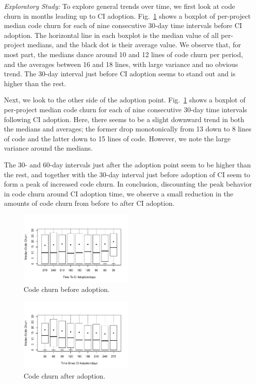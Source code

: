\smallskip\noindent \emph{Exploratory Study:} To explore general trends over 
time, we first look at code churn in months leading up to CI adoption.
Fig.~\ref{Fig:CodeChurnBefore} shows a boxplot of per-project median code 
churn for each of nine consecutive 30-day time intervals before CI adoption.
The horizontal line in each boxplot is the median value of all per-project medians, 
and the black dot is their average value.
We observe that, for most part, the medians dance around 10 and 12 lines of 
code churn per period, and the averages between 16 and 18 lines, with large 
variance and no obvious trend. 
The 30-day interval just before CI adoption seems to stand out and is higher 
than the rest.

Next, we look to the other side of the adoption point. 
Fig.~\ref{Fig:CodeChurnBefore} shows a boxplot of per-project median code 
churn for each of nine consecutive 30-day time intervals following CI adoption.
Here, there seems to be a slight downward trend in both the medians and 
averages; the former drop monotonically from 13 down to 8 lines of code and 
the latter down to 15 lines of code.
However, we note the large variance around the medians.

The 30- and 60-day intervals just after the adoption point seem to be higher 
than the rest, and together with the 30-day interval just before adoption of CI 
seem to form a peak of increased code churn.
In conclusion, discounting the peak behavior in code churn around CI adoption 
time, we observe a small reduction in the amounts of code churn from before 
to after CI adoption.


\begin{figure}[!t]
\centering
\includegraphics[width=0.5\textwidth]{churn_before.pdf}
\caption{Code churn before \Tvis adoption.}
\label{Fig:CodeChurnBefore}
\end{figure}


\begin{figure}[!t]
\centering
\includegraphics[width=0.5\textwidth]{churn_after.pdf}
\caption{Code churn after \Tvis adoption.}
\label{Fig:CodeChurnAfter}
\end{figure}

